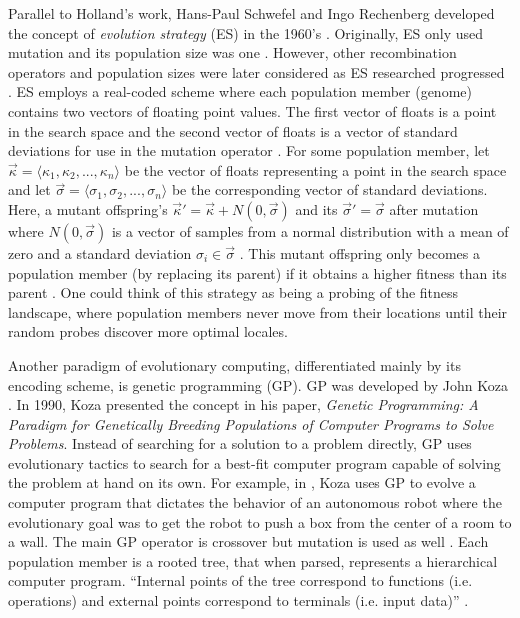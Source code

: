 Parallel to Holland's work, Hans-Paul Schwefel and Ingo Rechenberg developed the concept of \textit{evolution strategy} (ES) in the 1960's \cite{ColinReeves}. Originally, ES only used mutation and its population size was one \cite{Michalewicz}. However, other recombination operators and population sizes were later considered as ES researched progressed \cite{Herrera}. ES employs a real-coded scheme where each population member (genome) contains two vectors of floating point values. The first vector of floats is a point in the search space and the second vector of floats is a vector of standard deviations for use in the mutation operator \cite{Herrera}. For some population member, let $\vec{\kappa}=\langle\kappa_1,\kappa_2,...,\kappa_n\rangle$ be the vector of floats representing a point in the search space and let $\vec{\sigma}=\langle\sigma_1,\sigma_2,...,\sigma_n\rangle$ be the corresponding vector of standard deviations. Here, a mutant offspring's $\vec{\kappa}'=\vec{\kappa}+N(0,\vec{\sigma})$ and its $\vec{\sigma}'=\vec{\sigma}$ after mutation where $N(0,\vec{\sigma})$ is a vector of samples from a normal distribution with a mean of zero and a standard deviation $\sigma_i \in \vec{\sigma}$ \cite{Michalewicz}. This mutant offspring only becomes a population member (by replacing its parent) if it obtains a higher fitness than its parent \cite{Michalewicz}. One could think of this strategy as being a probing of the fitness landscape, where population members never move from their locations until their random probes discover more optimal locales.

Another paradigm of evolutionary computing, differentiated mainly by its encoding scheme, is genetic programming (GP). GP was developed by John Koza \cite{Michalewicz}. In 1990, Koza presented the concept in his paper, \textit{Genetic Programming: A Paradigm for Genetically Breeding Populations of Computer Programs to Solve Problems}. Instead of searching for a solution to a problem directly, GP uses evolutionary tactics to search for a best-fit computer program capable of solving the problem at hand on its own. For example, in \cite{DBLP:conf/aaai/KozaR92}, Koza uses GP to evolve a computer program that dictates the behavior of an autonomous robot where the evolutionary goal was to get the robot to push a box from the center of a room to a wall. The main GP operator is crossover but mutation is used as well \cite{Michalewicz}. Each population member is a rooted tree, that when parsed, represents a hierarchical computer program. ``Internal points of the tree correspond to functions (i.e. operations) and external points correspond to terminals (i.e. input data)'' \cite{DBLP:conf/aaai/KozaR92}. 

